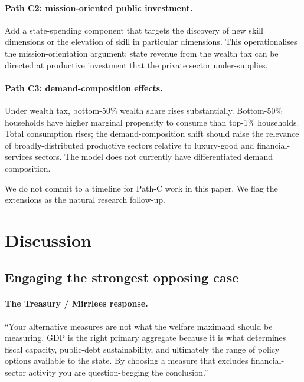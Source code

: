 \documentclass[11pt]{article}
\begin{document}
\paragraph{Path C2: mission-oriented public investment.}  Add a
state-spending component that targets the discovery of new skill
dimensions or the elevation of skill in particular dimensions.  This
operationalises the \citet{mazzucato2018value} mission-orientation
argument: state revenue from the wealth tax can be directed at
productive investment that the private sector under-supplies.

\paragraph{Path C3: demand-composition effects.}  Under wealth tax,
bottom-50\% wealth share rises substantially.  Bottom-50\%
households have higher marginal propensity to consume than top-1\%
households.  Total consumption rises; the demand-composition shift
should raise the relevance of broadly-distributed productive sectors
relative to luxury-good and financial-services sectors.  The model
does not currently have differentiated demand composition.

We do not commit to a timeline for Path-C work in this paper.  We
flag the extensions as the natural research follow-up.

\section{Discussion}
\label{sec:discussion}

\subsection{Engaging the strongest opposing case}

\paragraph{The Treasury / Mirrlees response.}  ``Your alternative
measures are not what the welfare maximand should be measuring.
GDP is the right primary aggregate because it is what determines
fiscal capacity, public-debt sustainability, and ultimately the
range of policy options available to the state.  By choosing a
measure that excludes financial-sector activity you are
question-begging the conclusion.''
\end{document}
